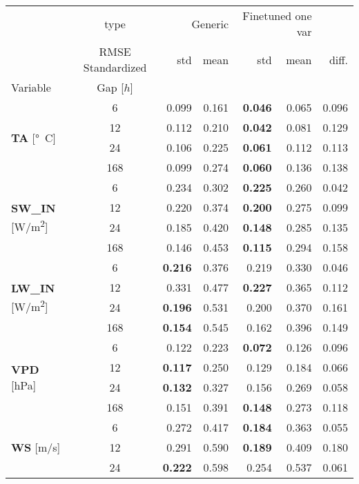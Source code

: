 \begin{table}
\centering
\begin{tabular}{p{2.1cm}c|rr|rr|r}
\toprule
 & type & \multicolumn{2}{r}{Generic} & \multicolumn{2}{r}{Finetuned one var} &  \\
 & RMSE Standardized & std & mean & std & mean & diff. \\
Variable & Gap [$h$] &  &  &  &  &  \\
\midrule
\multirow[c]{4}{*}{\parbox{2.1cm}{\textbf{TA} [\si{°C}]}} & 6 & 0.099 & 0.161 & \bfseries 0.046 & 0.065 & 0.096 \\
 & 12 & 0.112 & 0.210 & \bfseries 0.042 & 0.081 & 0.129 \\
 & 24 & 0.106 & 0.225 & \bfseries 0.061 & 0.112 & 0.113 \\
 & 168 & 0.099 & 0.274 & \bfseries 0.060 & 0.136 & 0.138 \\
\cline{1-7}
\multirow[c]{4}{*}{\parbox{2.1cm}{\textbf{SW\_IN} [\si{W/m^2}]}} & 6 & 0.234 & 0.302 & \bfseries 0.225 & 0.260 & 0.042 \\
 & 12 & 0.220 & 0.374 & \bfseries 0.200 & 0.275 & 0.099 \\
 & 24 & 0.185 & 0.420 & \bfseries 0.148 & 0.285 & 0.135 \\
 & 168 & 0.146 & 0.453 & \bfseries 0.115 & 0.294 & 0.158 \\
\cline{1-7}
\multirow[c]{4}{*}{\parbox{2.1cm}{\textbf{LW\_IN} [\si{W/m^2}]}} & 6 & \bfseries 0.216 & 0.376 & 0.219 & 0.330 & 0.046 \\
 & 12 & 0.331 & 0.477 & \bfseries 0.227 & 0.365 & 0.112 \\
 & 24 & \bfseries 0.196 & 0.531 & 0.200 & 0.370 & 0.161 \\
 & 168 & \bfseries 0.154 & 0.545 & 0.162 & 0.396 & 0.149 \\
\cline{1-7}
\multirow[c]{4}{*}{\parbox{2.1cm}{\textbf{VPD} [\si{hPa}]}} & 6 & 0.122 & 0.223 & \bfseries 0.072 & 0.126 & 0.096 \\
 & 12 & \bfseries 0.117 & 0.250 & 0.129 & 0.184 & 0.066 \\
 & 24 & \bfseries 0.132 & 0.327 & 0.156 & 0.269 & 0.058 \\
 & 168 & 0.151 & 0.391 & \bfseries 0.148 & 0.273 & 0.118 \\
\cline{1-7}
\multirow[c]{4}{*}{\parbox{2.1cm}{\textbf{WS} [\si{m/s}]}} & 6 & 0.272 & 0.417 & \bfseries 0.184 & 0.363 & 0.055 \\
 & 12 & 0.291 & 0.590 & \bfseries 0.189 & 0.409 & 0.180 \\
 & 24 & \bfseries 0.222 & 0.598 & 0.254 & 0.537 & 0.061 \\

\end{tabular}
\end{table}
